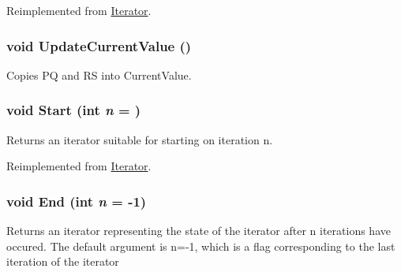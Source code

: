 Reimplemented from \hyperlink{classJKBuilder_1_1Iterator_a7874a07e98b52f4f147cde6f39353bae}{Iterator}.\hypertarget{classJKBuilder_1_1QuartetIterator_a1af5c865d6e9cfe63d0dedc53bdc13ba}{
\subsubsection[{UpdateCurrentValue}]{\setlength{\rightskip}{0pt plus 5cm}void UpdateCurrentValue ()}}
\label{classJKBuilder_1_1QuartetIterator_a1af5c865d6e9cfe63d0dedc53bdc13ba}


Copies PQ and RS into CurrentValue. \hypertarget{classJKBuilder_1_1QuartetIterator_a34ca36a99b20ae3170babadaffe51ed2}{
\subsubsection[{Start}]{\setlength{\rightskip}{0pt plus 5cm}void Start (int {\em n} = {})}}
\label{classJKBuilder_1_1QuartetIterator_a34ca36a99b20ae3170babadaffe51ed2}


Returns an iterator suitable for starting on iteration n. 

Reimplemented from \hyperlink{classJKBuilder_1_1Iterator_a34ca36a99b20ae3170babadaffe51ed2}{Iterator}.\hypertarget{classJKBuilder_1_1QuartetIterator_a5f692b73d2e160450f4617bb75825e11}{
\subsubsection[{End}]{\setlength{\rightskip}{0pt plus 5cm}void End (int {\em n} = {\ttfamily -\/1})}}
\label{classJKBuilder_1_1QuartetIterator_a5f692b73d2e160450f4617bb75825e11}


Returns an iterator representing the state of the iterator after n iterations have occured. The default argument is n=-\/1, which is a flag corresponding to the last iteration of the iterator 

